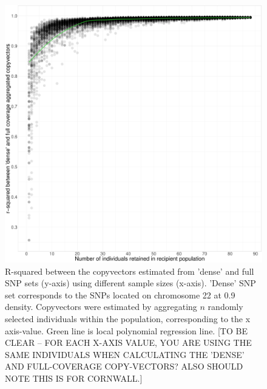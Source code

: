 \begin{figure}[htp]
    \centering
    \includegraphics[width=1.0\textwidth]{../images/chapter1/Ssparse_cornwall_collapsed_random_remove_inds.pdf}
    \caption{R-squared between the copyvectors estimated from 'dense' and full SNP sets (y-axis) using different sample sizes (x-axis). 'Dense' SNP set corresponds to the SNPs located on chromosome 22 at 0.9 density. Copyvectors were estimated by aggregating $n$ randomly selected individuals within the population, corresponding to the x axis-value. Green line is local polynomial regression line. {\color{red}[TO BE CLEAR -- FOR EACH X-AXIS VALUE, YOU ARE USING THE SAME INDIVIDUALS WHEN CALCULATING THE 'DENSE' AND FULL-COVERAGE COPY-VECTORS? ALSO SHOULD NOTE THIS IS FOR CORNWALL.]}}
    \label{fig:sparse_cornwall_collapsed_random_remove_inds}
\end{figure}

